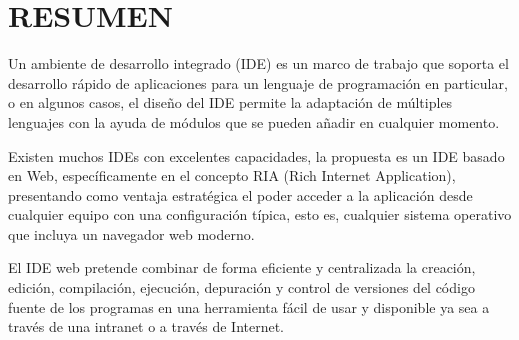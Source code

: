 \section{RESUMEN}

Un ambiente de desarrollo integrado (IDE) es un marco de trabajo que soporta el desarrollo rápido de aplicaciones para un lenguaje de programación en particular, o en algunos casos, el diseño del IDE permite la adaptación de múltiples lenguajes con la ayuda de módulos que se pueden añadir en cualquier momento.

Existen muchos IDEs con excelentes capacidades, la propuesta es un IDE basado en Web, específicamente en el concepto RIA (Rich Internet Application), presentando como ventaja estratégica el poder acceder a la aplicación desde cualquier equipo con una configuración típica, esto es, cualquier sistema operativo que incluya un navegador web moderno.

El IDE web pretende combinar de forma eficiente y centralizada la creación, edición, compilación, ejecución, depuración y control de versiones del código fuente de los programas en una herramienta fácil de usar y disponible ya sea a través de una intranet o a través de Internet.

